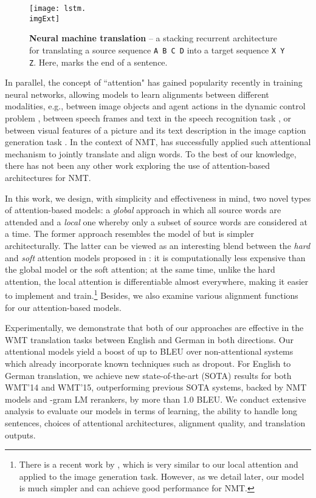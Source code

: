 \documentclass[11pt,a4paper]{article}
\newcommand{\imgExt}{eps}
\newcommand{\edit}[1]{{#1}} \newcommand{\hide}[1]{}
\begin{document}
\begin{figure}
\centering
\texttt{[image: lstm.\\imgExt]} \caption{{\bf Neural machine translation} -- a stacking recurrent architecture for translating a source sequence \texttt{A B C D} into a target sequence \texttt{X Y Z}. Here, \eos{} marks the end of a sentence.
} 
\label{f:lstm}
\end{figure}

In parallel, the concept of ``attention" has gained popularity recently in
training neural networks, allowing models to learn alignments between different
modalities, e.g., between image objects and agent actions in the dynamic control
problem \cite{mnih14}, between speech frames and text in the speech recognition
task \cite{jan14},  or between visual features of a picture and its text
description in the image caption generation task \cite{xu15}. In the context of
NMT,  has successfully applied such attentional mechanism to
jointly translate and align words. To the best of our knowledge, there has not
been any other work exploring the use of attention-based architectures for NMT.

In this work, we design, with simplicity and effectiveness in mind, two novel
types of attention-based models: a {\it global} approach in which all source
words are attended and a {\it local} one whereby only a subset of source words
are considered at a time. The former approach resembles the model of
\cite{bog15} but is simpler architecturally. The latter can be viewed as an
interesting blend between the {\it hard} and {\it soft} attention models
proposed in \cite{xu15}: \edit{it is computationally less expensive than the
global model or the soft attention; at the same time, unlike the hard attention,
the local attention is
differentiable almost everywhere, making it easier to implement and
train.\footnote{There is a recent work by \newcite{draw15}, which is very
similar to our local attention and applied to the image generation task.
However, as we detail later, our model is much simpler and can achieve good performance for NMT.} Besides, we also examine various
alignment functions for our attention-based models.}

Experimentally, we demonstrate that both of our approaches are
effective in the WMT translation tasks between English and German in  both
directions. \edit{Our attentional models yield a boost of up to \attngain{} BLEU over
non-attentional systems which already incorporate known techniques such as
dropout. For English to German translation, we achieve new state-of-the-art
(SOTA)
results for both WMT'14 and WMT'15, outperforming previous SOTA systems, backed by
NMT models and -gram LM rerankers, by more than 1.0 BLEU. We conduct
extensive analysis to evaluate our models in terms of learning, the ability to
handle long sentences, choices of attentional architectures, alignment quality, and translation
outputs. 
}
 
\end{document}
